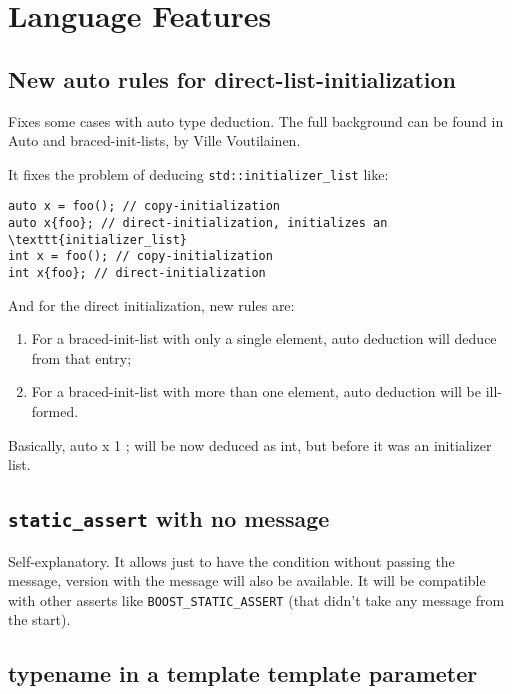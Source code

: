 \section{Language Features}

\subsection{New auto rules for direct-list-initialization}

Fixes some cases with auto type deduction. The full background can be found in Auto and braced-init-lists, by Ville Voutilainen.

It fixes the problem of deducing \texttt{std::initializer_list} like:

\begin{verbatim}
auto x = foo(); // copy-initialization
auto x{foo}; // direct-initialization, initializes an \texttt{initializer_list}
int x = foo(); // copy-initialization
int x{foo}; // direct-initialization
\end{verbatim}

And for the direct initialization, new rules are:

\begin{enumerate}
\item For a braced-init-list with only a single element, auto deduction will deduce from that entry;
\item For a braced-init-list with more than one element, auto deduction will be ill-formed.
\end{enumerate}

Basically, auto x { 1 }; will be now deduced as int, but before it was an initializer list.

\subsection{\texttt{static_assert} with no message}

Self-explanatory. It allows just to have the condition without passing the message, version with the message will also be available. It will be compatible with other asserts like \texttt{BOOST_STATIC_ASSERT} (that didn’t take any message from the start).

\subsection{typename in a template template parameter}

